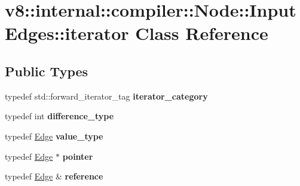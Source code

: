 \hypertarget{classv8_1_1internal_1_1compiler_1_1_node_1_1_input_edges_1_1iterator}{}\section{v8\+:\+:internal\+:\+:compiler\+:\+:Node\+:\+:Input\+Edges\+:\+:iterator Class Reference}
\label{classv8_1_1internal_1_1compiler_1_1_node_1_1_input_edges_1_1iterator}
\subsection*{Public Types}
\begin{DoxyCompactItemize}
\item 
typedef std\+::forward\+\_\+iterator\+\_\+tag {\bfseries iterator\+\_\+category}\hypertarget{classv8_1_1internal_1_1compiler_1_1_node_1_1_input_edges_1_1iterator_aec48fd6b4681a7ecfb55d78294d55892}{}\label{classv8_1_1internal_1_1compiler_1_1_node_1_1_input_edges_1_1iterator_aec48fd6b4681a7ecfb55d78294d55892}

\item 
typedef int {\bfseries difference\+\_\+type}\hypertarget{classv8_1_1internal_1_1compiler_1_1_node_1_1_input_edges_1_1iterator_a9ff7db1ca9ef24510a1635e513b6efe7}{}\label{classv8_1_1internal_1_1compiler_1_1_node_1_1_input_edges_1_1iterator_a9ff7db1ca9ef24510a1635e513b6efe7}

\item 
typedef \hyperlink{classv8_1_1internal_1_1compiler_1_1_edge}{Edge} {\bfseries value\+\_\+type}\hypertarget{classv8_1_1internal_1_1compiler_1_1_node_1_1_input_edges_1_1iterator_a7ef237b8729f2c95e3aaa786203f0de8}{}\label{classv8_1_1internal_1_1compiler_1_1_node_1_1_input_edges_1_1iterator_a7ef237b8729f2c95e3aaa786203f0de8}

\item 
typedef \hyperlink{classv8_1_1internal_1_1compiler_1_1_edge}{Edge} $\ast$ {\bfseries pointer}\hypertarget{classv8_1_1internal_1_1compiler_1_1_node_1_1_input_edges_1_1iterator_a504075c26d62de4d4d5cd9ab07c2cc08}{}\label{classv8_1_1internal_1_1compiler_1_1_node_1_1_input_edges_1_1iterator_a504075c26d62de4d4d5cd9ab07c2cc08}

\item 
typedef \hyperlink{classv8_1_1internal_1_1compiler_1_1_edge}{Edge} \& {\bfseries reference}\hypertarget{classv8_1_1internal_1_1compiler_1_1_node_1_1_input_edges_1_1iterator_aa5ccd077802a451cd5aaf4ff4f13f264}{}\label{classv8_1_1internal_1_1compiler_1_1_node_1_1_input_edges_1_1iterator_aa5ccd077802a451cd5aaf4ff4f13f264}

\end{DoxyCompactItemize}
